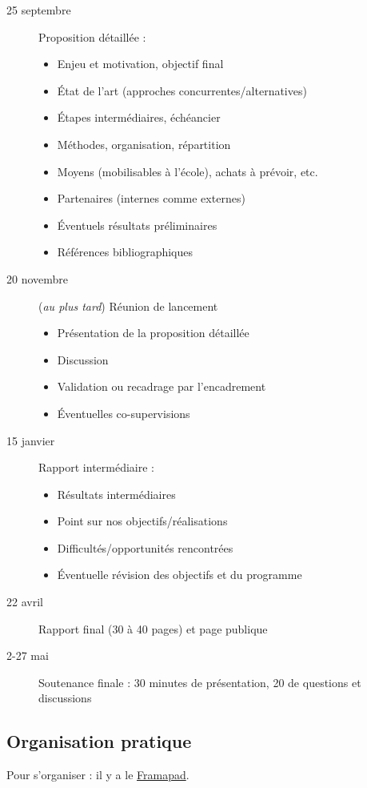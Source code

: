 \documentclass[a4paper, 11pt]{article}
\begin{document}
\begin{description}
	\item[25 septembre] Proposition détaillée :
	\begin{itemize}
		\item Enjeu et motivation, objectif final
		\item État de l'art (approches concurrentes/alternatives)
		\item Étapes intermédiaires, échéancier
		\item Méthodes, organisation, répartition
		\item Moyens (mobilisables à l'école), achats à prévoir, etc.
		\item Partenaires (internes comme externes)
		\item Éventuels résultats préliminaires
		\item Références bibliographiques
	\end{itemize}
	\item[20 novembre] (\emph{au plus tard}) Réunion de lancement
	\begin{itemize}
		\item Présentation de la proposition détaillée
		\item Discussion
		\item Validation ou recadrage par l'encadrement
		\item Éventuelles co-supervisions
	\end{itemize}
	\item[15 janvier] Rapport intermédiaire :
	\begin{itemize}
		\item Résultats intermédiaires
		\item Point sur nos objectifs/réalisations
		\item Difficultés/opportunités rencontrées
		\item Éventuelle révision des objectifs et du programme
	\end{itemize}
	\item[22 avril] Rapport final (30 à 40 pages) et page publique
	\item[2-27 mai] Soutenance finale : 30 minutes de présentation, 20 de questions et discussions
\end{description}

\subsection{Organisation pratique}

Pour s'organiser : il y a le \href{https://annuel.framapad.org/p/PSC_X2014_CGAFPAFG}{Framapad}.
\end{document}
